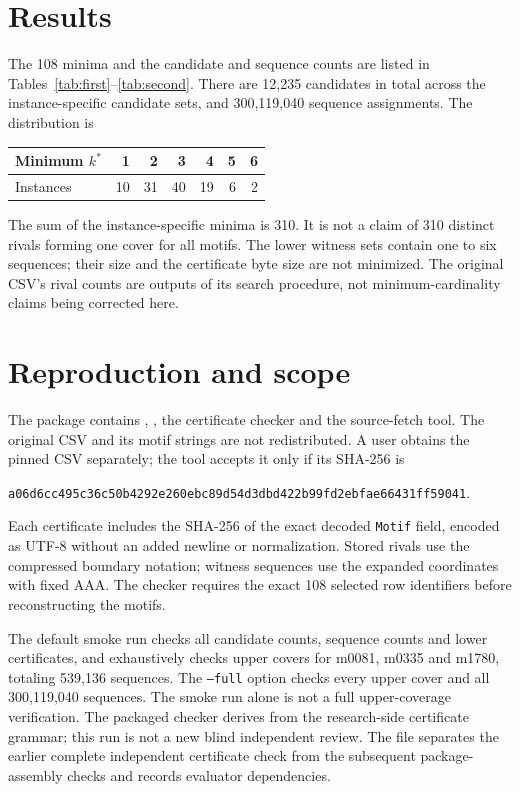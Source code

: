\documentclass[10pt,a4paper]{article}
\begin{document}
\section{Results}
The 108 minima and the candidate and sequence counts are listed in Tables~\ref{tab:first}--\ref{tab:second}. There are 12,235 candidates in total across the instance-specific candidate sets, and 300,119,040 sequence assignments. The distribution is
\begin{center}
\begin{tabular}{lrrrrrr}\toprule
Minimum $k^*$ &1&2&3&4&5&6\\\midrule
Instances &10&31&40&19&6&2\\\bottomrule
\end{tabular}
\end{center}
The sum of the instance-specific minima is 310. It is not a claim of 310 distinct rivals forming one cover for all motifs. The lower witness sets contain one to six sequences; their size and the certificate byte size are not minimized. The original CSV's rival counts are outputs of its search procedure, not minimum-cardinality claims being corrected here.
\newpage
\section{Reproduction and scope}
The package contains , , the certificate checker and the source-fetch tool. The original CSV and its motif strings are not redistributed. A user obtains the pinned CSV separately; the tool accepts it only if its SHA-256 is
\begin{center}\small\texttt{a06d6cc495c36c50b4292e260ebc89d54d3dbd422b99fd2ebfae66431ff59041}.\end{center}
Each certificate includes the SHA-256 of the exact decoded \texttt{Motif} field, encoded as UTF-8 without an added newline or normalization. Stored rivals use the compressed boundary notation; witness sequences use the expanded coordinates with fixed AAA. The checker requires the exact 108 selected row identifiers before reconstructing the motifs.

The default smoke run checks all candidate counts, sequence counts and lower certificates, and exhaustively checks upper covers for m0081, m0335 and m1780, totaling 539,136 sequences. The \texttt{--full} option checks every upper cover and all 300,119,040 sequences. The smoke run alone is not a full upper-coverage verification. The packaged checker derives from the research-side certificate grammar; this run is not a new blind independent review. The  file separates the earlier complete independent certificate check from the subsequent package-assembly checks and records evaluator dependencies.
\end{document}
